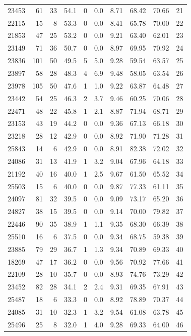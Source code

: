 \begin{longtable}{lrrrrrrrrr}
23453 & 61 & 33 & 54.1 & 0 & 0.0 & 8.71 & 68.42 & 70.66 & 21 \\
22115 & 15 & 8 & 53.3 & 0 & 0.0 & 8.41 & 65.78 & 70.00 & 22 \\
21853 & 47 & 25 & 53.2 & 0 & 0.0 & 9.21 & 63.40 & 62.01 & 23 \\
23149 & 71 & 36 & 50.7 & 0 & 0.0 & 8.97 & 69.95 & 70.92 & 24 \\
23836 & 101 & 50 & 49.5 & 5 & 5.0 & 9.28 & 59.54 & 63.57 & 25 \\
23897 & 58 & 28 & 48.3 & 4 & 6.9 & 9.48 & 58.05 & 63.54 & 26 \\
23978 & 105 & 50 & 47.6 & 1 & 1.0 & 9.22 & 63.87 & 64.48 & 27 \\
23442 & 54 & 25 & 46.3 & 2 & 3.7 & 9.46 & 60.25 & 70.06 & 28 \\
22471 & 48 & 22 & 45.8 & 1 & 2.1 & 8.87 & 71.94 & 68.71 & 29 \\
23153 & 43 & 19 & 44.2 & 0 & 0.0 & 9.36 & 67.13 & 66.18 & 30 \\
23218 & 28 & 12 & 42.9 & 0 & 0.0 & 8.92 & 71.90 & 71.28 & 31 \\
25843 & 14 & 6 & 42.9 & 0 & 0.0 & 8.91 & 82.38 & 72.02 & 32 \\
24086 & 31 & 13 & 41.9 & 1 & 3.2 & 9.04 & 67.96 & 64.18 & 33 \\
21192 & 40 & 16 & 40.0 & 1 & 2.5 & 9.67 & 61.50 & 65.52 & 34 \\
25503 & 15 & 6 & 40.0 & 0 & 0.0 & 9.87 & 77.33 & 61.11 & 35 \\
24097 & 81 & 32 & 39.5 & 0 & 0.0 & 9.09 & 73.17 & 65.20 & 36 \\
24827 & 38 & 15 & 39.5 & 0 & 0.0 & 9.14 & 70.00 & 79.82 & 37 \\
22446 & 90 & 35 & 38.9 & 1 & 1.1 & 9.35 & 68.30 & 66.39 & 38 \\
25510 & 16 & 6 & 37.5 & 0 & 0.0 & 9.34 & 68.75 & 59.38 & 39 \\
23885 & 79 & 29 & 36.7 & 1 & 1.3 & 9.34 & 70.89 & 69.33 & 40 \\
18269 & 47 & 17 & 36.2 & 0 & 0.0 & 9.56 & 70.92 & 77.66 & 41 \\
22109 & 28 & 10 & 35.7 & 0 & 0.0 & 8.93 & 74.76 & 73.29 & 42 \\
23452 & 82 & 28 & 34.1 & 2 & 2.4 & 9.31 & 69.35 & 67.91 & 43 \\
25487 & 18 & 6 & 33.3 & 0 & 0.0 & 8.92 & 78.89 & 70.37 & 44 \\
24085 & 31 & 10 & 32.3 & 1 & 3.2 & 9.54 & 61.08 & 63.78 & 45 \\
25496 & 25 & 8 & 32.0 & 1 & 4.0 & 9.28 & 69.33 & 64.00 & 46 \\

\end{longtable}
